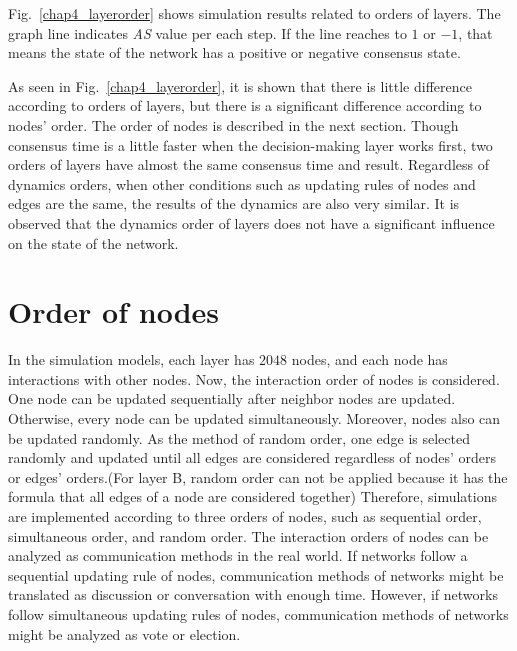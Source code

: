 Fig.~\ref{chap4_layerorder} shows simulation results related to orders of layers. The graph line indicates \textit{AS} value per each step. If the line reaches to $1$ or $-1$, that means the state of the network has a positive or negative consensus state.

As seen in Fig.~\ref{chap4_layerorder}, it is shown that there is little difference according to orders of layers, but there is a significant difference according to nodes' order. The order of nodes is described in the next section. Though consensus time is a little faster when the decision-making layer works first, two orders of layers have almost the same consensus time and result. Regardless of dynamics orders, when other conditions such as updating rules of nodes and edges are the same, the results of the dynamics are also very similar. It is observed that the dynamics order of layers does not have a significant influence on the state of the network. \\

\section{Order of nodes}
In the simulation models, each layer has $2048$ nodes, and each node has interactions with other nodes. Now, the interaction order of nodes is considered. One node can be updated sequentially after neighbor nodes are updated. Otherwise, every node can be updated simultaneously. Moreover, nodes also can be updated randomly. As the method of random order, one edge is selected randomly and updated until all edges are considered regardless of nodes' orders or edges' orders.(For layer B, random order can not be applied because it has the formula that all edges of a node are considered together) Therefore, simulations are implemented according to three orders of nodes, such as sequential order, simultaneous order, and random order. The interaction orders of nodes can be analyzed as communication methods in the real world. If networks follow a sequential updating rule of nodes, communication methods of networks might be translated as discussion or conversation with enough time. However, if networks follow simultaneous updating rules of nodes, communication methods of networks might be analyzed as vote or election.

